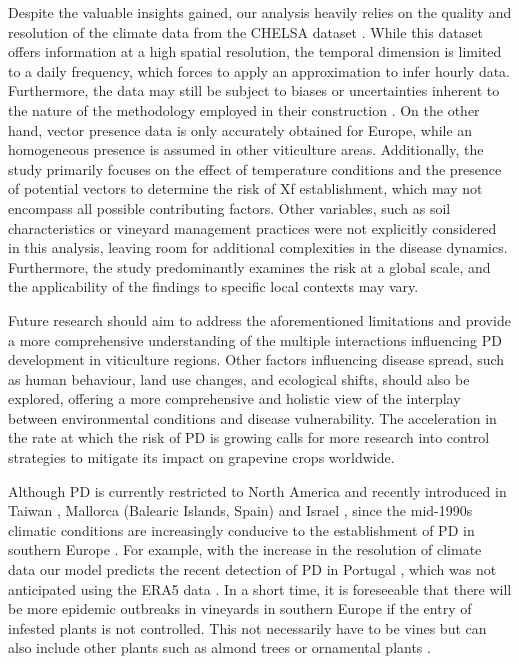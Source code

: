 Despite the valuable insights gained,  our analysis heavily relies on the
quality and resolution of the climate data from the CHELSA dataset
\cite{chelsa-climatologies-2021}. While this dataset offers information at a
high spatial resolution, the temporal dimension is limited to a daily
frequency, which forces to apply an approximation to infer hourly data.
Furthermore, the data may still be subject to biases or uncertainties inherent
to the nature of the methodology employed in their construction . On the other
hand, vector presence data is only accurately obtained for Europe, while an
homogeneous presence is assumed in other viticulture areas. Additionally, the
study primarily focuses on the effect of temperature conditions and the
presence of potential vectors to determine the risk of	Xf establishment, which
may not encompass all possible contributing factors. Other variables, such as
soil characteristics or vineyard management practices were not explicitly
considered in this analysis, leaving room for additional complexities in the
disease dynamics. Furthermore, the study predominantly examines the risk at a
global scale, and the applicability of the findings to specific local contexts
may vary.

Future research should aim to address the aforementioned limitations and
provide a more comprehensive understanding of the multiple interactions
influencing PD development  in viticulture regions. Other factors influencing
disease spread, such as human behaviour, land use changes, and ecological
shifts, should also be explored, offering a more comprehensive and holistic
view of the interplay between environmental conditions and disease
vulnerability. The acceleration in the rate at which the risk of PD is growing
calls for more research into control strategies to mitigate its impact on
grapevine crops worldwide.

Although PD is currently restricted to North America and recently
introduced in Taiwan \cite{su2013pierce}, Mallorca (Balearic Islands, Spain)
\cite{gomila2019draft,moralejo2019insights} and Israel
\cite{zecharia2022xylella}, since the mid-1990s climatic conditions are
increasingly conducive to the establishment of PD in southern Europe
\cite{GimenezRomero2022_CommsBio}. For example, with the increase in the
resolution of
climate data our model predicts  the recent detection of PD in Portugal
\cite{loureiro2023xylella}, which was not anticipated using the ERA5 data
\cite{GimenezRomero2022_CommsBio}. In a short time, it is foreseeable that
there will
be more epidemic outbreaks in vineyards in southern Europe if the entry of
infested plants is not controlled. This not necessarily have to be vines but
can also include other plants such as almond trees or ornamental plants
\cite{moralejo2020phylogenetic}.

